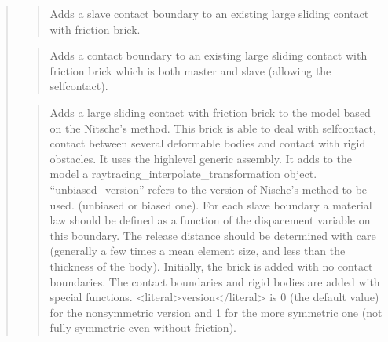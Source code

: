 \documentclass[a4paper,11pt,english]{sphinxmanual}
\begin{document}
\begin{quote}
\begin{quote}
\sphinxAtStartPar
Adds a slave contact boundary to an existing large sliding contact
with friction brick.
\end{quote}

\sphinxAtStartPar
{}
\begin{quote}

\sphinxAtStartPar
Adds a contact boundary to an existing large sliding contact
with friction brick which is both master and slave
(allowing the self\sphinxhyphen{}contact).
\end{quote}

\sphinxAtStartPar
{}
\begin{quote}

\sphinxAtStartPar
Adds a large sliding contact with friction brick to the model based on the Nitsche’s method.
This brick is able to deal with self\sphinxhyphen{}contact, contact between
several deformable bodies and contact with rigid obstacles.
It uses the high\sphinxhyphen{}level generic assembly. It adds to the model
a raytracing\_interpolate\_transformation object. “unbiased\_version” refers to the version of Nische’s method to be used.
(unbiased or biased one).
For each slave boundary a  material law should be defined as a function of the dispacement variable on this boundary.
The release distance should be determined with care
(generally a few times a mean element size, and less than the
thickness of the body). Initially, the brick is added with no contact
boundaries. The contact boundaries and rigid bodies are added with
special functions. \textless{}literal\textgreater{}version\textless{}/literal\textgreater{} is 0 (the default value) for the
non\sphinxhyphen{}symmetric version and 1 for the more symmetric one
(not fully symmetric even without friction).
\end{quote}

\sphinxAtStartPar
{}
\begin{quote}


\end{quote}
\end{quote}
\end{document}
